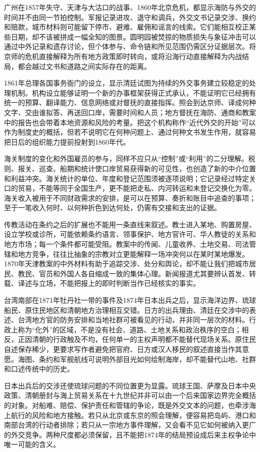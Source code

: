 广州在1857年失守、天津与大沽口的战事、1860年北京危机，都显示海防与外交的时间并不由同一节拍控制。军报记录进攻、退守和调兵，外交文书记录交涉、换约和赔款，城市材料则可能留下停市、避难、雇佣和谣言的线索。它们能相互校正某些日期，却不该被拼成一幅全知的图景。圆明园被焚掠的物质损失与象征冲击可以通过中外记录和遗存讨论，但个体参与、命令链和所见范围仍需区分证据层次。将京师的危机直接解释为所有地方政策即时转向，或将沿海行动直接解释为内战结局，都会越过文书和道路之间实际存在的距离。

1861年总理各国事务衙门的设立，显示清廷试图为持续的外交事务建立较稳定的处理机制。机构设立能够证明一个新的办事框架获得正式承认，不能证明它已经拥有统一的预算、翻译能力、信息网络或对督抚的直接指挥。照会到达京师、译成何种文字、交由谁拟答、再送回口岸，需要时间和人员；地方督抚在海防、通商和教案中的报告也会带着本地资源和风险的考量。把这个机构称作“近代外交的开始”可以作为制度史的概括，但若不说明它在何种问题上、通过何种文书发生作用，就容易把日后的组织能力提前投射到1860年代。

海关制度的变化和外国雇员的参与，同样不应只从“控制”或“利用”的二分理解。税则、报关、巡查、船期和统计使口岸贸易获得新的可见性，也创造了新的中介位置和利益冲突。海关统计的单位、年度和登记范围须被逐项说明；它记录经过特定关口的贸易，不能等同于全国生产，更不能把走私、内河转运和未登记交换化为零。海关收入被用于不同财政需求的安排，是可以在预算、奏折和账目中追查的事项；至于一笔收入何时、以何种折色到达何处，仍需有交接和支出的证据。

传教活动在条约之后的扩展也不能用一条直线来叙述。教士进入某地、购置房屋、设立学校或诊所，可能依赖条约语言、领事保护、地方官许可、华人教徒的关系和地方市场；每一个条件都可能受阻。教案中的传闻、儿童收养、土地交易、司法管辖和地方竞争，往往比抽象的宗教对立更能解释一场冲突何以在某时某地爆发。1870年天津教案的中外材料有助于追踪交涉、处分和舆论，却不能让我们把城市居民、教民、官员和外国人各自缩成一致的集体心理。新闻报道尤其要辨认首发、转载、译述与立场，不能把报上的即时判断当作已经核实的事实。

台湾南部在1871年牡丹社一带的事件及1874年日本出兵之后，显示海洋边界、琉球船民、原住民地区和清朝地方治理相互交错。日方的出兵理由、清廷在交涉中的表述、台湾地方官的防务安排和当地社群可被看见的行动，并非同一层次的材料。行政上称为“化外”的区域，不是没有社会、道路、土地关系和政治秩序的空白；相反，正因清朝的行政触及不均，任何单一的主权声明都不能替代现场关系。原住民自述保存稀少，更要求写作者避免把官府、日方或汉人移民的叙述直接当作其意愿。海图、条约和军舰航线可说明外部目光如何绘制海岸，却不能替代山地、社群和口述传统中的历史。

日本出兵后的交涉还使琉球问题的不同位置更为显露。琉球王国、萨摩及日本中央政策、清朝册封与海上贸易关系在十九世纪并非可以由一个后来国家边界完全概括的对象。对船难、赔偿、保护责任和管辖的争论，既是外交文本的问题，也牵涉海上航行的风险和地方接触。若只从北京或东京的照会理解，便容易把岛屿、港口和南部台湾的行动者排除；若只从一宗地方事件理解，又会看不见它如何被纳入更广的外交竞争。两种尺度都必须保留，且不能把1874年的结局预设成后来主权争论中唯一可能的含义。

